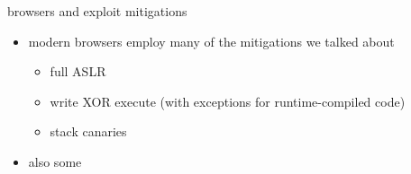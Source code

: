 
\begin{frame}{browsers and exploit mitigations}
    \begin{itemize}
    \item modern browsers employ many of the mitigations we talked about
        \begin{itemize}
        \item full ASLR
        \item write XOR execute (with exceptions for runtime-compiled code)
        \item stack canaries
        \end{itemize}
    \item also some 
    \end{itemize}
\end{frame}

